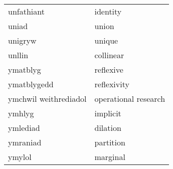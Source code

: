 \begin{supertabular}{p{0.22\textwidth}p{0.22\textwidth}}
unfathiant & identity \\
uniad & union \\
unigryw & unique \\
unllin & collinear \\
ymatblyg & reflexive \\
ymatblygedd & reflexivity \\
ymchwil weithrediadol & operational research \\
ymhlyg & implicit \\
ymlediad & dilation \\
ymraniad & partition \\
ymylol & marginal \\
\end{supertabular}
